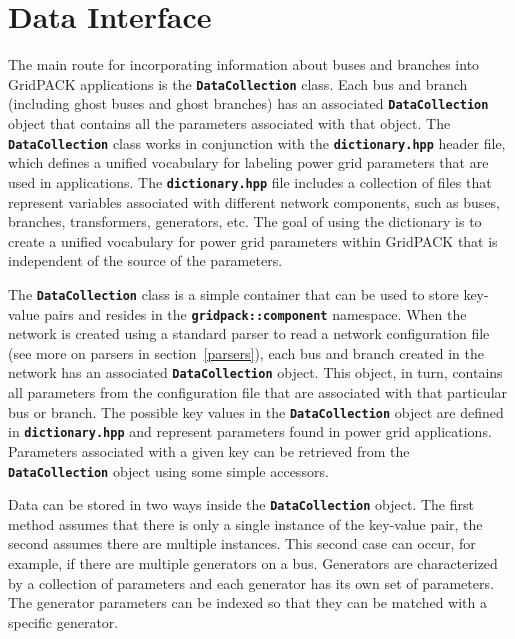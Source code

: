 \section{Data Interface}\label{data_interface}

The main route for incorporating information about buses and branches into
GridPACK applications is the \texttt{\textbf{DataCollection}} class. Each bus
and branch (including ghost buses and ghost branches) has an associated
\texttt{\textbf{DataCollection}} object that contains all the parameters
associated with that object. The \texttt{\textbf{DataCollection}} class works in
conjunction with the \texttt{\textbf{dictionary.hpp}} header file, which defines
a unified vocabulary for labeling power grid parameters that are used in
applications. The \texttt{\textbf{dictionary.hpp}} file includes a collection of
files that represent variables associated with different network components,
such as buses, branches, transformers, generators, etc. The goal of using the dictionary is to create a unified vocabulary for power grid parameters within GridPACK that is independent of the source of the parameters.

The \texttt{\textbf{DataCollection}} class is a simple container that can be
used to store key-value pairs and resides in the
\texttt{\textbf{gridpack::component}} namespace. When the network is created
using a standard parser to read a network configuration file (see more on
parsers in section~\ref{parsers}), each bus and branch created in the network has an associated \texttt{\textbf{DataCollection}} object. This object, in turn, contains all parameters from the configuration file that are associated with that particular bus or branch. The possible key values in the \texttt{\textbf{DataCollection}} object are defined in \texttt{\textbf{dictionary.hpp}} and represent parameters found in power grid applications. Parameters associated with a given key can be retrieved from the \texttt{\textbf{DataCollection}} object using some simple accessors.

Data can be stored in two ways inside the \texttt{\textbf{DataCollection}} object. The first method assumes that there is only a single instance of the key-value pair, the second assumes there are multiple instances. This second case can occur, for example, if there are multiple generators on a bus. Generators are characterized by a collection of parameters and each generator has its own set of parameters. The generator parameters can be indexed so that they can be matched with a specific generator.

